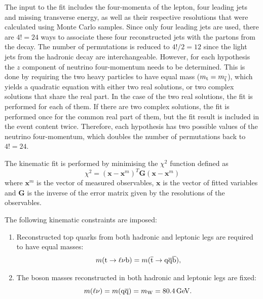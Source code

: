 The input to the fit includes the four-momenta of the lepton, four leading jets and missing transverse energy, as well
as their respective resolutions that were calculated using Monte Carlo samples. Since only four leading jets are used,
there are $4!=24$ ways to associate these four reconstructed jets with the partons from the \ttbar decay. The number of
permutations is reduced to $4!/2=12$ since the light jets from the hadronic \W decay are interchangeable. However, for
each hypothesis the $z$ component of neutrino four-momentum needs to be determined. This is done by requiring the two
heavy particles to have equal mass ($m_{\mathrm{t}} = m_{\overline{\mathrm{t}}}$), which yields a quadratic equation with either two real
solutions, or two complex solutions that share the real part. In the case of the two real solutions, the fit is
performed for each of them. If there are two complex solutions, the fit is performed once for the common real part of
them, but the fit result is included in the event content twice. Therefore, each hypothesis has two possible values of
the neutrino four-momentum, which doubles the number of permutations back to $4!=24$.

The kinematic fit is performed by minimising the $\chi^{2}$ function defined as
\begin{equation}
\chi^{2}  = (\mathbf{x} - \mathbf{x}^{m})^{T}\mathbf{G}(\mathbf{x} - \mathbf{x}^{m})
\end{equation}
where $\mathbf{x}^{m}$ is the vector of measured observables, $\mathbf{x}$ is the vector of fitted variables and
$\mathbf{G}$ is the inverse of the error matrix given by the resolutions of the observables.

The following kinematic constraints are imposed:
\begin{enumerate}[topsep=\parskip, parsep=\parskip, itemsep=\parskip, leftmargin=\leftmargin]
	\item Reconstructed top quarks from both hadronic and leptonic legs are required to have equal masses:
	\begin{equation}
		m(\mathrm{t} \to \ell \nu \mathrm{b}) = m(\overline{\mathrm{t}} \to \mathrm{q}\overline{\mathrm{q}} \overline{\mathrm{b}}),
	\end{equation}
	\item The \W boson masses reconstructed in both hadronic and leptonic legs are fixed:
	\begin{equation}
		m(\ell \nu) = m(\cPq\cPaq) = m_{\W} = \SI{80.4}{\GeV}.
	\end{equation}
\end{enumerate}

